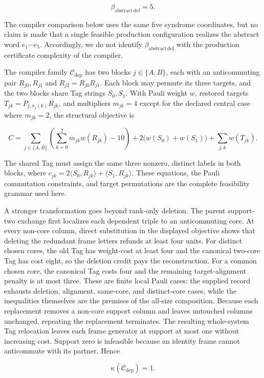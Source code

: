 \documentclass[
  11pt,
]{article}
\begin{document}
\[
\beta_{\mathrm{abstract\,del}}=5.
\]

The compiler comparison below uses the same five syndrome coordinates,
but no claim is made that a single feasible production configuration
realizes the abstract word \(e_1\cdots e_5\). Accordingly, we do not
identify \(\beta_{\mathrm{abstract\,del}}\) with the production
certificate complexity of the compiler.

The compiler family \(\mathcal C_{\mathrm{dep}}\) has two blocks
\(j\in\{A,B\}\), each with an anticommuting pair \(R_{j0},R_{j1}\) and
\(R_{j2}=R_{j0}R_{j1}\). Each block may permute its three targets, and
the two blocks share Tag strings \(S_0,S_1\). With Pauli weight \(w\),
restored targets \(T_{jk}=P_{j,\pi_j(k)}R_{jk}\), and multipliers
\(m_{jk}=4\) except for the declared central case where \(m_{jk}=2\),
the structural objective is

\[
C=\sum_{j\in\{A,B\}}\left(\sum_{k=0}^2m_{jk}w(R_{jk})-10\right)
  +2\bigl(w(S_0)+w(S_1)\bigr)+\sum_{j,k}w(T_{jk}).
\]

The shared Tag must assign the same three nonzero, distinct labels in
both blocks, where
\(c_{jk}=2\langle S_0,R_{jk}\rangle+\langle S_1,R_{jk}\rangle\). These
equations, the Pauli commutation constraints, and target permutations
are the complete feasibility grammar used here.

A stronger transformation goes beyond rank-only deletion. The parent
support-two exchange first localizes each dependent triple to an
anticommuting core. At every non-core column, direct substitution in the
displayed objective shows that deleting the redundant frame letters
refunds at least four units. For distinct chosen cores, the old Tag has
weight-cost at least four and the canonical two-core Tag has cost eight,
so the deletion credit pays the reconstruction. For a common chosen
core, the canonical Tag costs four and the remaining target-alignment
penalty is at most three. These are finite local Pauli cases: the
supplied record exhausts deletion, alignment, same-core, and
distinct-core cases, while the inequalities themselves are the premises
of the all-size composition. Because each replacement removes a non-core
support column and leaves untouched columns unchanged, repeating the
replacement terminates. The resulting whole-system Tag relocation leaves
each frame generator at support at most one without increasing cost.
Support zero is infeasible because an identity frame cannot anticommute
with its partner. Hence

\[
\kappa(\mathcal C_{\mathrm{dep}})=1.
\]
\end{document}
